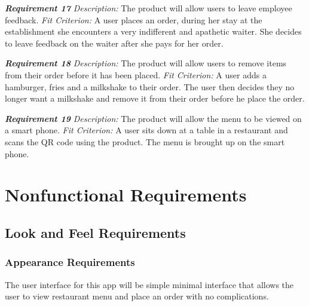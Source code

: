 \documentclass[12pt, titlepage]{article}
\begin{document}
\textbf{\textit{Requirement 17}}\newline
\textit{Description:}\newline
The product will allow users to leave employee feedback. \newline\newline
\textit{Fit Criterion:}\newline 
A user places an order, during her stay at the establishment she encounters a very indifferent and apathetic waiter. She decides to leave feedback on the waiter after she pays for her order.
\newline

\textbf{\textit{Requirement 18}}\newline
\textit{Description:}\newline
The product will allow users to remove items from their order before it has been placed. \newline\newline
\textit{Fit Criterion:}\newline 
A user adds a hamburger, fries and a milkshake to their order. The user then decides they no longer want a milkshake and remove it from their order before he place the order.
\newline

\textbf{\textit{Requirement 19}}\newline
\textit{Description:}\newline
The product will allow the menu to be viewed on a smart phone. \newline\newline
\textit{Fit Criterion:}\newline 
A user sits down at a table in a restaurant and scans the QR code using the product. The menu is brought up on the smart phone.
\newline

\section{Nonfunctional Requirements}
\subsection{Look and Feel Requirements}
\subsubsection{Appearance Requirements}
The user interface for this app will be simple minimal interface that allows the user to view restaurant menu and place an order with no complications. 
\end{document}
